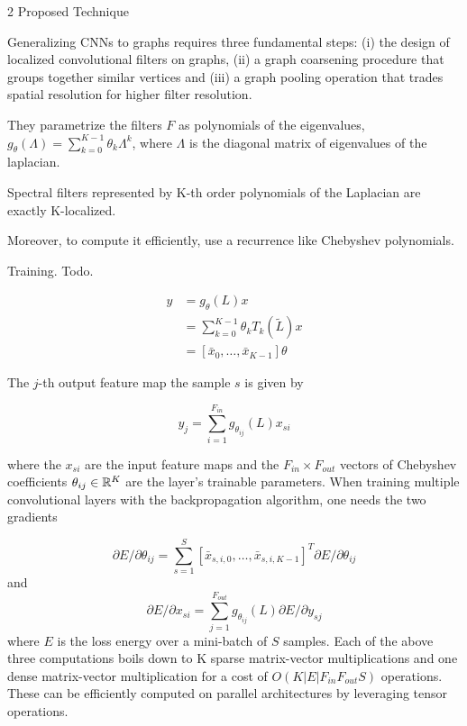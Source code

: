 \documentclass[english]{article}
\begin{document}
\item 2 Proposed Technique

Generalizing CNNs to graphs requires three fundamental steps: (i) the design of localized convolutional filters on graphs, (ii) a graph coarsening procedure that groups together similar vertices and
(iii) a graph pooling operation that trades spatial resolution for higher filter resolution.

\item They parametrize the filters $F$ as polynomials of the eigenvalues, $g_\theta(\Lambda) = \sum_{k=0}^{K-1} \theta_k \Lambda^k$, where $\Lambda$ is the diagonal matrix of eigenvalues of the laplacian. 

Spectral filters represented by K-th order polynomials of the Laplacian are exactly K-localized.

\item Moreover, to compute it efficiently, use a recurrence like Chebyshev polynomials. 

\item Training. Todo.

\begin{align*}
y &= g_\theta(L) x\\
&= \sum_{k=0}^{K-1}\theta_k T_k(\tilde L)x\\
&=[\bar x_0, \ldots, \bar x_{K-1}]\theta
\end{align*}


The $j$-th output feature map  the sample $s$ is given by

$$y_j = \sum_{i=1}^{F_{in}} g_{\theta_{ij}}(L) x_{si} $$


where the $x_{si}$ are the input feature maps and the $F_{in} \times F_{out}$ vectors of Chebyshev coefficients $\theta_{ij} \in \mathbb{R}^K$ are the layer’s trainable parameters. When training multiple convolutional layers with the backpropagation algorithm, one needs the two gradients

$$
\partial E/\partial{\theta_{ij}}
=
\sum_{s=1}^S
[\bar{x}_{s,i,0} ,\ldots, \bar{x}_{s,i,K-1}]^T
\partial E/\partial{\theta_{ij}}
$$
and 
$$
\partial E/\partial{x_{si}}
=
\sum_{j=1}^{F_{out}}
 g_{\theta_{ij}}(L)
\partial E/\partial{y_{sj}}
$$
where $E$ is the loss energy over a mini-batch of $S$ samples. Each of the above three computations boils down to K sparse matrix-vector multiplications and one dense matrix-vector multiplication for
a cost of $O(K|E|F_{in} F_{out} S)$ operations. These can be efficiently computed on parallel architectures
by leveraging tensor operations.
\end{document}
